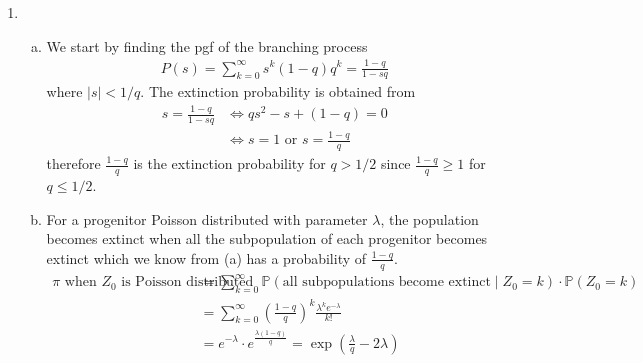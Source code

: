 \documentclass[a4paper,10pt]{article}
\theoremstyle{definition}
\begin{document}
\begin{enumerate}
\begin{enumerate}[(i)]
\end{enumerate}
\item
\begin{enumerate}[(a)]
\item We start by finding the pgf of the branching process
\begin{align*}
P(s)=\sum_{k=0}^{\infty}s^k(1-q)q^k=\frac{1-q}{1-sq}
\end{align*}
where $|s|<1/q$. The extinction probability is obtained from
\begin{align*}
s=\frac{1-q}{1-sq} &\Leftrightarrow qs^2-s+(1-q)=0\\
&\Leftrightarrow s=1 \text{ or } s=\frac{1-q}{q}
\end{align*}
therefore $\frac{1-q}{q}$ is the extinction probability for $q>1/2$ since $\frac{1-q}{q}\geq 1$ for $q \leq 1/2$.
\item For a progenitor Poisson distributed with parameter $\lambda$, the population becomes extinct when all the subpopulation of each progenitor becomes extinct which we know from (a) has a probability of $\frac{1-q}{q}$.
\begin{align*}
\pi \text{ when $Z_0$ is Poisson distributed}
&= \sum_{k=0}^{\infty}\mathbb{P}(\text{all subpopulations become extinct}\mid Z_0=k)\cdot\mathbb{P}(Z_0=k)\\
&=\sum_{k=0}^{\infty}\left(\frac{1-q}{q}\right)^k\frac{\lambda^ke^{-\lambda}}{k!}\\
&=e^{-\lambda}\cdot e^{\frac{\lambda(1-q)}{q}}=\exp\left(\frac{\lambda}{q}-2\lambda\right)
\end{align*}


\end{enumerate}
\end{enumerate}
\end{document}
